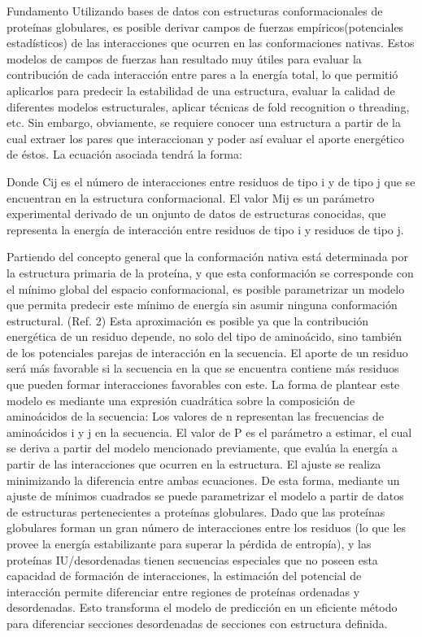 Fundamento
Utilizando bases de datos con estructuras conformacionales de proteínas globulares, 
es posible derivar campos de fuerzas empíricos(potenciales estadísticos) de las interacciones que ocurren en las conformaciones nativas. 
Estos modelos de campos de fuerzas han resultado muy útiles para evaluar la contribución de cada interacción entre pares a la energía total,
lo que permitió aplicarlos para predecir la estabilidad de una estructura, evaluar la calidad de diferentes modelos estructurales, aplicar técnicas de fold recognition o threading, etc. 
Sin embargo, obviamente, se requiere conocer una estructura a partir de la cual extraer los pares que interaccionan y poder así evaluar el aporte energético de éstos. 
La ecuación asociada tendrá la forma:





Donde Cij es el número de interacciones entre residuos de tipo i y de tipo j que se encuentran en la estructura conformacional. 
El valor Mij es un parámetro experimental derivado de un onjunto de datos de estructuras conocidas, que representa la energía de interacción entre residuos de tipo i y residuos de tipo j.

Partiendo del concepto general que la conformación nativa está determinada por la estructura primaria de la proteína, y que esta conformación se corresponde con el mínimo global del
espacio conformacional, es posible parametrizar un modelo que permita predecir este mínimo de energía sin asumir ninguna conformación estructural. (Ref. 2)
Esta aproximación es posible ya que la contribución energética de un residuo depende, no solo del tipo de aminoácido, sino también de los potenciales parejas de interacción en la secuencia. 
El aporte de un residuo será más favorable si la secuencia en la que se encuentra contiene más residuos que pueden formar interacciones favorables con este. 
La forma de plantear este modelo es mediante una expresión cuadrática sobre la composición de aminoácidos de la secuencia:
Los valores de n representan las frecuencias de aminoácidos i y j en la secuencia.
El valor de P es el parámetro a estimar, el cual se deriva a partir del modelo mencionado previamente, que evalúa la energía a partir de las interacciones que ocurren en la estructura. 
El ajuste se realiza minimizando la diferencia entre ambas ecuaciones.
De esta forma, mediante un ajuste de mínimos cuadrados se puede parametrizar el modelo a partir de datos de estructuras pertenecientes a proteínas globulares.
Dado que las proteínas globulares forman un gran número de interacciones entre los residuos (lo que les provee la energía estabilizante para superar la pérdida de entropía), 
y las proteínas IU/desordenadas tienen secuencias especiales que no poseen esta capacidad de formación de interacciones, la estimación del potencial de interacción permite diferenciar entre 
regiones de proteínas ordenadas y desordenadas. Esto transforma el modelo de predicción en un eficiente método para diferenciar secciones desordenadas de secciones con estructura definida.

